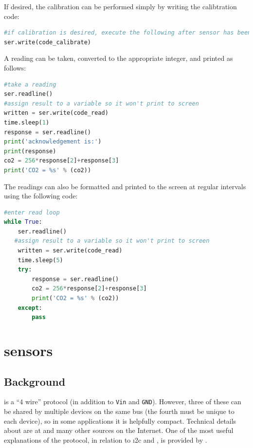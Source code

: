 If desired, the calibration can be performed simply by writing the calibtration code:
\begin{lstlisting}[language=Python]
#if calibration is desired, execute the following after sensor has been sitting in outdoor air for 20 minutes
ser.write(code_calibrate)
\end{lstlisting}

A reading can be taken, converted to the appropriate integer, and printed as follows:

\begin{lstlisting}[language=Python]
#take a reading
ser.readline()
#assign result to a variable so it won't print to screen
written = ser.write(code_read) 
time.sleep(1)
response = ser.readline()
print('acknowledgement is:')
print(response)
co2 = 256*response[2]+response[3]
print('CO2 = %s' % (co2))
\end{lstlisting}

The readings can also be formatted and printed to the screen at regular intervals using the following code:

\begin{lstlisting}[language=Python]
#enter read loop
while True:
    ser.readline()
   #assign result to a variable so it won't print to screen
    written = ser.write(code_read) 
    time.sleep(5)
    try:
        response = ser.readline()
        co2 = 256*response[2]+response[3]
        print('CO2 = %s' % (co2))
    except:
        pass
\end{lstlisting}

\newpage



\section{\spi sensors}
\subsection{Background}
\spi is a ``4 wire'' protocol (in addition to \texttt{Vin} and \texttt{GND}).
However, three of these can be shared by multiple devices on the same \spi bus (the fourth must be unique to each device), so in some applications it is helpfully compact.
Technical details about \spi are at  and many other sources on the Internet.
One of the most useful explanations of the \spi protocol, in relation to \i2c and \uart, is provided by .

